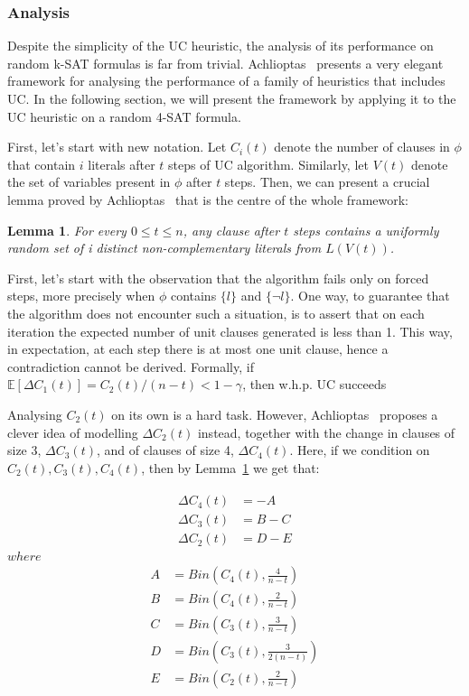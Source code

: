 \documentclass[10pt]{article}
\newtheorem{lemma}[theorem]{Lemma}
\begin{document}
\subsubsection*{Analysis}

Despite the simplicity of the UC heuristic, the analysis of its performance on random k-SAT formulas is far from trivial. Achlioptas~\cite{satdiffeq} presents a very elegant framework for analysing the performance of a family of heuristics that includes UC\@. In the following section, we will present the framework by applying it to the UC heuristic on a random 4-SAT formula.
\par
First, let's start with new notation. Let $C_i(t)$ denote the number of clauses in $\phi$ that contain $i$ literals after $t$ steps of UC algorithm. Similarly, let $V(t)$ denote the set of variables present in $\phi$ after $t$ steps. Then, we can present a crucial lemma proved by Achlioptas~\cite{satdiffeq} that is the centre of the whole framework:
\begin{lemma}\label{lem:uni_rand}
    For every $ 0 \le t \le n$, any clause after $t$ steps contains a uniformly random set of i distinct non-complementary literals from $L(V(t))$.
\end{lemma}

First, let's start with the observation that the algorithm fails only on forced steps, more precisely when $\phi$ contains $\{ l \}$ and $\{ \neg l \}$. One way, to guarantee that the algorithm does not encounter such a situation, is to assert that on each iteration the
expected number of unit clauses generated is less than 1. This way, in expectation, at each step there is at most one unit clause, hence a contradiction cannot be derived.
Formally, if $\mathbb{E}[\Delta C_1(t)] = C_2(t)/(n - t) < 1 - \gamma $, then w.h.p. UC succeeds
\par 
Analysing $C_2(t)$ on its own is a hard task. However, Achlioptas~\cite{satdiffeq} proposes a clever idea of modelling $\Delta C_2(t)$ instead, together with the change in clauses of size 3, $\Delta C_3(t)$, and of clauses of size 4, $\Delta C_4(t)$. Here, if we condition on $C_2(t), C_3(t), C_4(t)$, then by Lemma~\ref{lem:uni_rand} we get that:

\begin{align}\begin{split}
    \Delta C_4(t) &= - A
\\
    \Delta C_3(t) &= B - C
\\
    \Delta C_2(t) &= D - E
\end{split} \end{align}
$where$
\begin{align}
\begin{split}
    A &= Bin(C_4(t), \frac{4}{n - t})\\
    B &= Bin(C_4(t), \frac{2}{n - t})\\
    C &= Bin(C_3(t), \frac{3}{n - t})\\
    D &= Bin(C_3(t), \frac{3}{2(n - t)})\\
    E &= Bin(C_2(t), \frac{2}{n-t})
\end{split}
\end{align}
\end{document}
